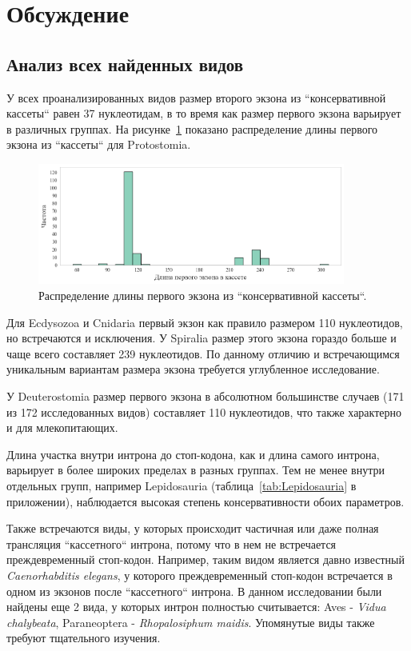 \clearpage
\section{Обсуждение}

\subsection{Анализ всех найденных видов}

У всех проанализированных видов размер второго экзона из ``консервативной кассеты`` равен 37 нуклеотидам, в то время как размер первого экзона варьирует в различных группах.
На рисунке~\ref{fig:Protostomia_exon} показано распределение длины первого экзона из ``кассеты`` для Protostomia.

\begin{figure}[h] %
    \centering
    \includegraphics[width=0.9\textwidth]{images/Protostomia_exon}
    \caption{Распределение длины первого экзона из ``консервативной кассеты``.}
    \label{fig:Protostomia_exon}
\end{figure}

Для Ecdysozoa и Cnidaria первый экзон как правило размером 110 нуклеотидов, но встречаются и исключения.
У Spiralia размер этого экзона гораздо больше и чаще всего составляет 239 нуклеотидов.
По данному отличию и встречающимся уникальным вариантам размера экзона требуется углубленное исследование.

У Deuterostomia размер первого экзона в абсолютном большинстве случаев (171 из 172 исследованных видов) составляет 110 нуклеотидов, что также характерно и для млекопитающих.

Длина участка внутри интрона до стоп-кодона, как и длина самого интрона, варьирует в более широких пределах в разных группах.
Тем не менее внутри отдельных групп, например Lepidosauria (таблица~\ref{tab:Lepidosauria} в приложении), наблюдается высокая степень консервативности обоих параметров.

Также встречаются виды, у которых происходит частичная или даже полная трансляция ``кассетного`` интрона, потому что в нем не встречается преждевременный стоп-кодон.
Например, таким видом является давно известный \textit{Caenorhabditis elegans}, у которого преждевременный стоп-кодон встречается в одном из экзонов после ``кассетного`` интрона.
В данном исследовании были найдены еще 2 вида, у которых интрон полностью считывается: Aves - \textit{Vidua chalybeata}, Paraneoptera - \textit{Rhopalosiphum maidis}.
Упомянутые виды также требуют тщательного изучения.


